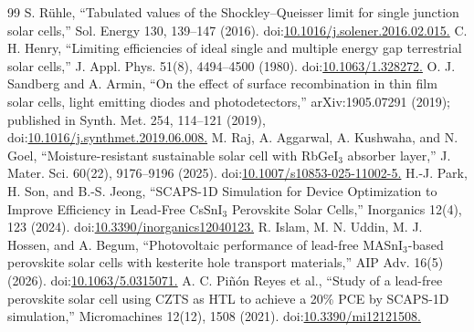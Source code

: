 \documentclass[review]{elsarticle}
\begin{document}
\begin{thebibliography}{99}
 S. Rühle, ``Tabulated values of the Shockley--Queisser limit for single junction solar cells,'' Sol. Energy 130, 139--147 (2016). doi:\url{10.1016/j.solener.2016.02.015.}
 C. H. Henry, ``Limiting efficiencies of ideal single and multiple energy gap terrestrial solar cells,'' J. Appl. Phys. 51(8), 4494--4500 (1980). doi:\url{10.1063/1.328272.}
 O. J. Sandberg and A. Armin, ``On the effect of surface recombination in thin film solar cells, light emitting diodes and photodetectors,'' arXiv:1905.07291 (2019); published in Synth. Met. 254, 114--121 (2019), doi:\url{10.1016/j.synthmet.2019.06.008.}
 M. Raj, A. Aggarwal, A. Kushwaha, and N. Goel, ``Moisture-resistant sustainable solar cell with RbGeI$_{3}$ absorber layer,'' J. Mater. Sci. 60(22), 9176--9196 (2025). doi:\url{10.1007/s10853-025-11002-5.}
 H.-J. Park, H. Son, and B.-S. Jeong, ``SCAPS-1D Simulation for Device Optimization to Improve Efficiency in Lead-Free CsSnI$_{3}$ Perovskite Solar Cells,'' Inorganics 12(4), 123 (2024). doi:\url{10.3390/inorganics12040123.}
 R. Islam, M. N. Uddin, M. J. Hossen, and A. Begum, ``Photovoltaic performance of lead-free MASnI$_{3}$-based perovskite solar cells with kesterite hole transport materials,'' AIP Adv. 16(5) (2026). doi:\url{10.1063/5.0315071.}
 A. C. Piñón Reyes et al., ``Study of a lead-free perovskite solar cell using CZTS as HTL to achieve a 20\% PCE by SCAPS-1D simulation,'' Micromachines 12(12), 1508 (2021). doi:\url{10.3390/mi12121508.}
\end{thebibliography}
\end{document}

